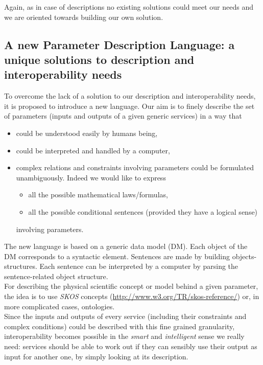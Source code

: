 \documentclass[a4paper,11pt] {article}
\begin{document}
Again, as in case of descriptions no existing solutions could meet our needs and we are oriented
towards building our own solution.

\subsection{A new Parameter Description Language: a unique solutions to description and interoperability needs}
To overcome the lack of a  solution to our description and interoperability
needs, it is proposed to introduce a new language.
Our aim is to finely describe the set of parameters (inputs and outputs of a given generic services)
in a way that
\begin{itemize}
\item could be understood easily by humans being,
\item could be interpreted and handled by a computer,
\item complex relations and constraints involving parameters could be formulated unambiguously.
Indeed we would like to express
\begin{itemize}
\item all the possible mathematical laws/formulas,
\item all the possible conditional sentences (provided they have a logical sense)
\end{itemize}
involving parameters.
\end{itemize}
The new language is based on a generic data model (DM). Each object of the DM corresponds to a
syntactic element. Sentences are made by building objects-structures.
Each sentence can be interpreted by a computer by parsing the sentence-related object structure.\\
For describing the physical scientific concept or model behind a given parameter, the idea is to use
{\it SKOS} concepts
(\href{http://www.w3.org/TR/skos-reference/}{http://www.w3.org/TR/skos-reference/}) or, in more
complicated cases, ontologies.\\

Since the inputs and outputs  of every service (including their constraints and complex conditions)
could be described with this fine grained granularity, interoperability becomes possible in the {\it
smart} and {\it intelligent} sense we really need: services should be able to work out if they can
sensibly use their output as input for another one, by simply looking at its description.\\
\end{document}
